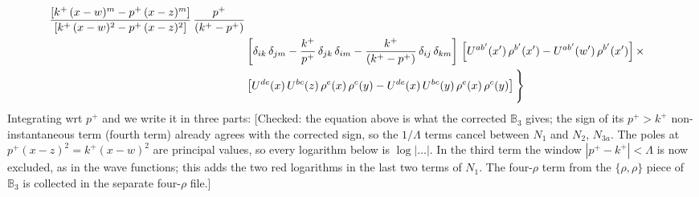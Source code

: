 \documentclass[9pt]{article}
\def\mf#1{\mathbb{#1}}
\numberwithin{equation}{section}
\begin{document}
\begin{align}
\frac{\left[k^{+}\,(x-w)^{m}-p^{+}\,(x-z)^{m}\right]}{\left[k^{+}\,(x-w)^{2}-p^{+}\,(x-z)^{2}\right]}\,\frac{p^{+}}{(k^{+}-p^{+})}\notag \\ & \left[\delta_{ik}\, \delta_{jm} - \frac{k^{+}}{p^{+}}\, \delta_{jk}\, \delta_{im}-\frac{k^{+}}{(k^{+}-p^{+})}\, \delta_{ij}\,\delta_{km}\right]\, \left[U^{ab'}(x')\,\rho^{b'}(x')-U^{ab'}(w')\, \rho^{b'}(x')\right]\times\notag \\ & \left[U^{de}(x)\,U^{bc}(z)\, \rho^{e}(x)\,\rho^{c}(y)-U^{de}(x)\,U^{bc}(y)\,\rho^{e}(x)\,\rho^{c}(y)\right]\Bigg\}
\end{align}
Integrating wrt $p^{+}$ and we write it in three parts: {\color{red}[Checked: the equation above is what the corrected $\mf{B}_{3}$ gives; the sign of its $p^{+}>k^{+}$ non-instantaneous term (fourth term) already agrees with the corrected sign, so the $1/\Lambda$ terms cancel between $N_{1}$ and $N_{2}$, $N_{3a}$. The poles at $p^{+}(x-z)^{2}=k^{+}(x-w)^{2}$ are principal values, so every logarithm below is $\log|\dots|$. In the third term the window $|p^{+}-k^{+}|<\Lambda$ is now excluded, as in the wave functions; this adds the two red logarithms in the last two terms of $N_{1}$. The four-$\rho$ term from the $\{\rho,\rho\}$ piece of $\mf{B}_{3}$ is collected in the separate four-$\rho$ file.]}
\end{document}
